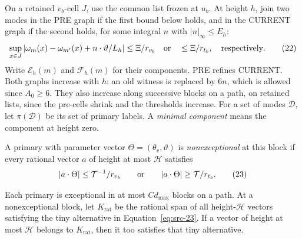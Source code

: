On a retained \(v_b\)-cell \(J\), use the common list frozen at
\(u_b\).  At height \(h\), join two modes in the PRE graph if the
first bound below holds, and in the CURRENT graph if the second
holds, for some integral \(n\) with \(|n|_\infty\le E_h\):
\begin{equation*}
 \sup_{x\in J}
 \left|\omega_m(x)-\omega_{m'}(x)
                  +n\cdot\vartheta/L_h\right|
 \le \Xi/r_{v_b}
 \quad\hbox{or}\quad
 \le \Xi/r_{t_b},
 \quad\hbox{respectively}.
 \tag{22}\label{eq:src-22}
\end{equation*}
Write \(\mathcal E_h(m)\) and \(\mathcal F_h(m)\) for their
components.  PRE refines CURRENT.  Both graphs increase with \(h\):
an old witness is replaced by \(6n\), which is allowed since
\(A_0\ge6\).  They also increase along successive blocks on a path,
on retained lists, since the pre-cells shrink and the thresholds
increase.  For a set of modes \(\mathcal D\), let \(\pi(\mathcal D)\)
be its set of primary labels.  A \emph{minimal component} means the
component at height zero.

A primary with parameter vector \(\Theta=(\theta_v,\vartheta)\) is
\emph{nonexceptional} at this block if every rational vector \(a\)
of height at most \(\mathcal H\) satisfies
\begin{equation*}
 |a\cdot\Theta|\le\mathcal T^{-1}/r_{v_b}
 \qquad\hbox{or}\qquad
 |a\cdot\Theta|\ge\mathcal T/r_{t_b}.
 \tag{23}\label{eq:src-23}
\end{equation*}

\begin{lemma}
\label{lem:linear-exceptional}
Each primary is exceptional in at most \(C d_{\max}\) blocks on a
path.  At a nonexceptional block, let \(K_{\mathrm{rat}}\) be the
rational span of all height-\(\mathcal H\) vectors satisfying the
tiny alternative in Equation~\eqref{eq:src-23}.  If a vector of height
at most \(\mathcal H\) belongs to \(K_{\mathrm{rat}}\), then it too
satisfies that tiny alternative.
\end{lemma}

